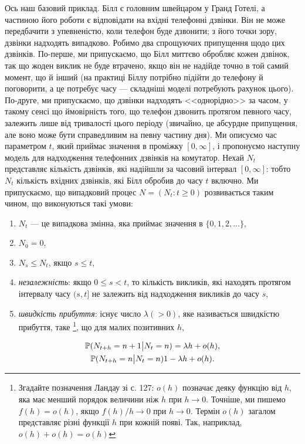 \documentclass[12pt,fleqn]{article}
\numberwithin{figure}{section}
\numberwithin{equation}{section}
\begin{document}
Ось наш базовий приклад. Білл є головним швейцаром у Гранд Готелі, а частиною його роботи є відповідати на вхідні телефонні дзвінки. Він не може передбачити з упевненістю, коли телефон буде дзвонити; з його точки зору, дзвінки надходять випадково. Робимо два спрощуючих припущення щодо цих дзвінків. По-перше, ми припускаємо, що Білл миттєво обробляє кожен дзвінок, так що жоден виклик не буде втрачено, якщо він не надійде точно в той самий момент, що й інший (на практиці Біллу потрібно підійти до телефону й поговорити, а це потребує часу --- складніші моделі потребують рахунок цього). По-друге, ми припускаємо, що дзвінки надходять <<однорідно>> за часом, у такому сенсі що ймовірність того, що телефон дзвонить протягом певного часу, залежить лише від тривалості цього періоду (звичайно, це абсурдне припущення, але воно може бути справедливим на певну частину дня). Ми описуємо час параметром $t$, який приймає значення в проміжку $[0,\infty]$, і пропонуємо наступну модель для надходження телефонних дзвінків на комутатор. Нехай $N_t$ представляє кількість дзвінків, які надійшли за часовий інтервал $[0,\infty]$: тобто $N_t$ кількість вхідних дзвінків, які Білл обробив до часу $t$ включно. Ми припускаємо, що випадковий процес $N=(N_t:t\geq 0)$ розвивається таким чином, що виконуються такі умови:
\begin{enumerate}
  \item $N_t$ --- це випадкова змінна, яка приймає значення в $\{0,1,2,\dots \}$,
  \item $N_0=0$,
  \item $N_s\leq N_t$, якщо $s\leq t$,
  \item \emph{незалежність}: якщо $0\leq s < t$, то кількість викликів, які находять протягом інтервалу часу $(s,t]$ не залежить від надходження викликів до часу $s$,
  \item \emph{швидкість прибуття}: існує число $\lambda (>0)$, яке називається швидкістю прибуття, таке \footnote{Згадайте позначення Ландау зі с. 127: $o(h)$ позначає деяку функцію від $h$, яка має менший порядок величини ніж $h$ при $h\rightarrow 0$. Точніше, ми пишемо $f(h)=o(h)$, якщо $f(h)/h\rightarrow0$ при $h\rightarrow 0$. Термін $o(h)$ загалом представляє різні функції $h$ при кожній появі. Так, наприклад, $o(h)+o(h)=o(h)$}, що для малих позитивних $h$,
\end{enumerate}
\begin{equation}\label{11.1}
  \centering
  \begin{gathered}
  \mathbb{P}(N_{t+h}=n+1\big|N_t=n)=\lambda h+o(h),\\
  \mathbb{P}(N_{t+h}=n\big|N_t=n)1-\lambda h +o(h).
  \end{gathered}
\end{equation}
\end{document}
